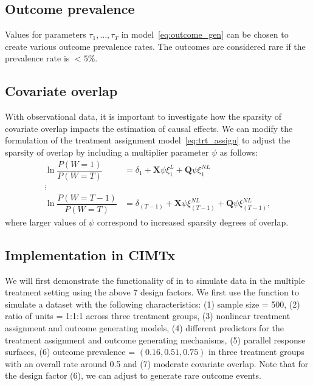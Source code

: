 \subsection{Outcome prevalence}\label{outcome_prevalence}
Values for parameters $\tau_1, \ldots, \tau_{T}$ in model~\eqref{eq:outcome_gen} can be chosen to create various outcome prevalence rates. The outcomes are considered rare if the prevalence rate is $< 5\%$. 

\subsection{Covariate overlap}\label{covariate_overlap}
With observational data, it is important to investigate how the sparsity of covariate overlap impacts the estimation of causal effects. We can modify the formulation of the treatment assignment model~\eqref{eq:trt_assign} to adjust the sparsity of overlap by including a multiplier parameter $\psi$ \citep{hu2021estimatingsim}  as follows:  
\begin{equation}\label{eq:trt_assign_overlap}
\begin{split}
\ln  \dfrac{P(W=1)}{P(W=T)} &= \delta_1 + \bm{X}\psi\xi_1^L + \bm{Q}\psi\xi_1^{NL}\\
\vdots \\
\ln  \dfrac{P(W=T-1)}{P(W=T)} &= \delta_{(T-1)} + \bm{X}\psi\xi_{(T-1)}^{NL} + \bm{Q}\psi\xi_{(T-1)}^{NL},
\end{split}
\end{equation}
where larger values of $\psi$ correspond to increased sparsity degrees of overlap. 

\subsection{Implementation in CIMTx}\label{sec:example_data_simulation}

We will first demonstrate the functionality of  in  to simulate data in the multiple treatment setting using the above 7 design factors. We first use the  function to simulate a dataset with the following characteristics: (1) sample size = 500, (2) ratio of units  = 1:1:1 across three treatment groups,  (3) nonlinear treatment assignment and outcome generating models,  (4) different predictors for the treatment assignment and outcome generating mechanisms, (5) parallel response surfaces, (6) outcome prevalence = $(0.16, 0.51, 0.75)$ in three treatment groups  with an overall rate around 0.5 and (7) moderate covariate overlap. Note that for the design factor (6),  we can adjust  to generate rare outcome events. 

